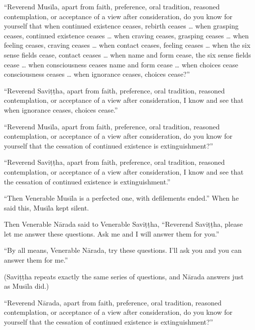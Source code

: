 \documentclass[12pt,openany]{book}%
\begin{document}
“Reverend \textsanskrit{Musīla}, apart from faith, preference, oral tradition, reasoned contemplation, or acceptance of a view after consideration, do you know for yourself that when continued existence ceases, rebirth ceases … when grasping ceases, continued existence ceases … when craving ceases, grasping ceases … when feeling ceases, craving ceases … when contact ceases, feeling ceases … when the six sense fields cease, contact ceases … when name and form cease, the six sense fields cease … when consciousness ceases name and form cease … when choices cease consciousness ceases … when ignorance ceases, choices cease?” 

“Reverend \textsanskrit{Saviṭṭha}, apart from faith, preference, oral tradition, reasoned contemplation, or acceptance of a view after consideration, I know and see that when ignorance ceases, choices cease.” 

“Reverend \textsanskrit{Musīla}, apart from faith, preference, oral tradition, reasoned contemplation, or acceptance of a view after consideration, do you know for yourself that the cessation of continued existence is extinguishment?” 

“Reverend \textsanskrit{Saviṭṭha}, apart from faith, preference, oral tradition, reasoned contemplation, or acceptance of a view after consideration, I know and see that the cessation of continued existence is extinguishment.” 

“Then Venerable \textsanskrit{Musīla} is a perfected one, with defilements ended.” When he said this, \textsanskrit{Musīla} kept silent. 

Then Venerable \textsanskrit{Nārada} said to Venerable \textsanskrit{Saviṭṭha}, “Reverend \textsanskrit{Saviṭṭha}, please let me answer these questions. Ask me and I will answer them for you.” 

“By all means, Venerable \textsanskrit{Nārada}, try these questions. I’ll ask you and you can answer them for me.” 

(\textsanskrit{Saviṭṭha} repeats exactly the same series of questions, and \textsanskrit{Nārada} answers just as \textsanskrit{Musīla} did.) 

“Reverend \textsanskrit{Nārada}, apart from faith, preference, oral tradition, reasoned contemplation, or acceptance of a view after consideration, do you know for yourself that the cessation of continued existence is extinguishment?” 
\end{document}
